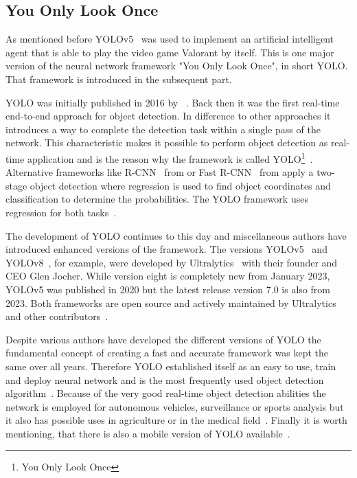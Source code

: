 \subsection[Neural Network Framework: You Only Look Once]{You Only Look 
Once}\label{subsec:intro:yolo}

As mentioned before YOLOv5~\cite{jocher2020} was used to implement an artificial intelligent agent 
that is able to play the video game Valorant by itself. This is one major version of the neural network 
framework "You Only Look Once", in short YOLO. That framework is introduced in the subsequent 
part.

YOLO was initially published in 2016 by \citeauthor{redmon2016}~\cite{redmon2016}. Back then it 
was the first real-time end-to-end approach for object detection. In difference to other approaches it 
introduces a way to complete the detection task within a single pass of the network. This 
characteristic makes it possible to perform object detection as real-time application and is the 
reason why the framework is called YOLO\footnote{You Only Look Once}~\cite{terven2023}. 
Alternative frameworks like R-CNN~\cite{girshick1994} from \citeyear{girshick1994} or Fast 
R-CNN~\cite{girshick2015} from \citeyear{girshick2015} apply a two-stage object detection where 
regression is used to find object coordinates and classification to determine the probabilities. The 
YOLO framework uses regression for both tasks~\cite{aydin2023, terven2023}.

The development of YOLO continues to this day and miscellaneous authors have introduced 
enhanced versions of the framework. The versions YOLOv5~\cite{jocher2020} and 
YOLOv8~\cite{jocher2023}, for example, were developed by Ultralytics~\cite{ultralytics} with their 
founder and CEO Glen Jocher. While version eight is completely new from January 2023,  
YOLOv5 was published in 2020 but the latest release version 7.0 is also from 2023. Both 
frameworks are open source and actively maintained by Ultralytics and other 
contributors~\cite{terven2023}.

Despite various authors have developed the different versions of YOLO the fundamental concept of 
creating a fast and accurate framework was kept the same over all years. Therefore YOLO 
established itself as an easy to use, train and deploy neural network and is the most frequently used 
object detection algorithm~\cite{aydin2023, terven2023}. Because of the very good real-time object 
detection abilities the network is employed for autonomous vehicles, surveillance or sports 
analysis but it also has possible uses in agriculture or in the medical field~\cite{terven2023, 
zheng2022}. Finally it is worth mentioning, that there is also a mobile version of YOLO 
available~\cite{terven2023}.

